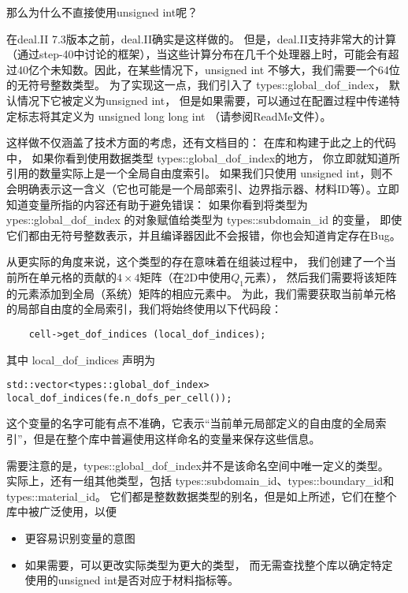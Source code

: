 \documentclass{ctexart}
\begin{document}
那么为什么不直接使用unsigned int呢？

在deal.II 7.3版本之前，deal.II确实是这样做的。
但是，deal.II支持非常大的计算（通过step-40中讨论的框架），当这些计算分布在几千个处理器上时，可能会有超过40亿个未知数。因此，在某些情况下，unsigned int 不够大，我们需要一个64位的无符号整数类型。
为了实现这一点，我们引入了 types::global\_dof\_index，
默认情况下它被定义为unsigned int，
但是如果需要，可以通过在配置过程中传递特定标志将其定义为 unsigned long long int
（请参阅ReadMe文件）。

这样做不仅涵盖了技术方面的考虑，还有文档目的：
在库和构建于此之上的代码中，
如果你看到使用数据类型 types::global\_dof\_index的地方，
你立即就知道所引用的数量实际上是一个全局自由度索引。
如果我们只使用 unsigned int，则不会明确表示这一含义（它也可能是一个局部索引、边界指示器、材料ID等）。立即知道变量所指的内容还有助于避免错误：
如果你看到将类型为 ypes::global\_dof\_index 的对象赋值给类型为
 types::subdomain\_id 的变量，
即使它们都由无符号整数表示，并且编译器因此不会报错，你也会知道肯定存在Bug。

从更实际的角度来说，这个类型的存在意味着在组装过程中，
我们创建了一个当前所在单元格的贡献的$ 4 \times 4 矩阵$（在2D中使用$ Q_1 $元素），
然后我们需要将该矩阵的元素添加到全局（系统）矩阵的相应元素中。
为此，我们需要获取当前单元格的局部自由度的全局索引，我们将始终使用以下代码段：
\begin{lstlisting}
    cell->get_dof_indices (local_dof_indices);
\end{lstlisting}
其中 local\_dof\_indices 声明为
\begin{lstlisting}
std::vector<types::global_dof_index> local_dof_indices(fe.n_dofs_per_cell());
\end{lstlisting}
这个变量的名字可能有点不准确，它表示“当前单元局部定义的自由度的全局索引”，但是在整个库中普遍使用这样命名的变量来保存这些信息。

需要注意的是，types::global\_dof\_index并不是该命名空间中唯一定义的类型。
实际上，还有一组其他类型，包括
types::subdomain\_id、types::boundary\_id和types::material\_id。
它们都是整数数据类型的别名，但是如上所述，它们在整个库中被广泛使用，以便
\begin{itemize}
    \item 更容易识别变量的意图
    \item 如果需要，可以更改实际类型为更大的类型，
    而无需查找整个库以确定特定使用的unsigned int是否对应于材料指标等。
\end{itemize}
\end{document}
